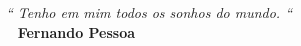 \def\textoEpigrafe{
  Tenho em mim todos os sonhos do mundo.
}

\def\autorEpigrafe{Fernando Pessoa}

\begin{epigrafe}
  \vspace*{\fill}
  \hfill{}
  \parbox{6cm}{
    \begin{flushright}
      \textit{``\textoEpigrafe``}\\
      \bigbreak\
      \textbf{\autorEpigrafe}
  
    \end{flushright}
  }
\end{epigrafe}
